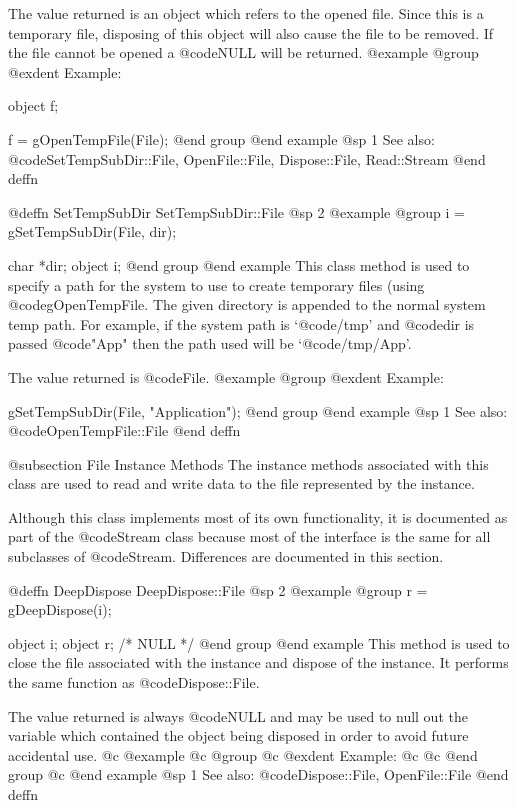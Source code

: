 The value returned is an object which refers to the opened file.  Since
this is a temporary file, disposing of this object will also cause the
file to be removed.  If the file cannot be opened a @code{NULL} will be
returned.
@example
@group
@exdent Example:

object  f;

f = gOpenTempFile(File);
@end group
@end example
@sp 1
See also:  @code{SetTempSubDir::File, OpenFile::File, Dispose::File, Read::Stream}
@end deffn







@deffn {SetTempSubDir} SetTempSubDir::File
@sp 2
@example
@group
i = gSetTempSubDir(File, dir);

char  *dir;
object  i;
@end group
@end example
This class method is used to specify a path for the system to use to
create temporary files (using @code{gOpenTempFile}.  The given directory
is appended to the normal system temp path.  For example, if the system
path is `@code{/tmp}' and @code{dir} is passed @code{"App"} then the
path used will be `@code{/tmp/App}'.

The value returned is @code{File}.
@example
@group
@exdent Example:

gSetTempSubDir(File, "Application");
@end group
@end example
@sp 1
See also:  @code{OpenTempFile::File}
@end deffn





@subsection File Instance Methods
The instance methods associated with this class are used to read and write
data to the file represented by the instance.

Although this class implements most of its own functionality, it is
documented as part of the @code{Stream} class because most of the
interface is the same for all subclasses of @code{Stream}.  Differences
are documented in this section.





@deffn {DeepDispose} DeepDispose::File
@sp 2
@example
@group
r = gDeepDispose(i);

object  i;
object  r;     /*  NULL  */
@end group
@end example
This method is used to close the file associated with the instance and
dispose of the instance.  It performs the same function as
@code{Dispose::File}.  

The value returned is always @code{NULL} and may be used to null out
the variable which contained the object being disposed in order to
avoid future accidental use.
@c @example
@c @group
@c @exdent Example:
@c 
@c @end group
@c @end example
@sp 1
See also:  @code{Dispose::File, OpenFile::File}
@end deffn











